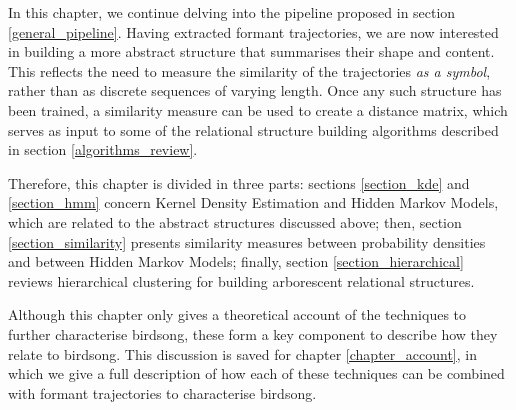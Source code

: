 \documentclass[../main.tex]{subfiles}
\begin{document}
 \label{chapter_hmms}
In this chapter, we continue delving into the pipeline proposed in section \ref{general_pipeline}. Having extracted formant trajectories, we are now interested in building a more abstract structure that summarises their shape and content. This reflects the need to measure the similarity of the trajectories \emph{as a symbol}, rather than as discrete sequences of varying length. Once any such structure has been trained, a similarity measure can be used to create a distance matrix, which serves as input to some of the relational structure building algorithms described in section \ref{algorithms_review}.
\par Therefore, this chapter is divided in three parts: sections \ref{section_kde} and \ref{section_hmm} concern Kernel Density Estimation and Hidden Markov Models, which are related to the abstract structures discussed above; then, section \ref{section_similarity} presents similarity measures between probability densities and between Hidden Markov Models; finally, section \ref{section_hierarchical} reviews hierarchical clustering for building arborescent relational structures.
\par Although this chapter only gives a theoretical account of the techniques to further characterise birdsong, these form a key component to describe how they relate to birdsong. This discussion is saved for chapter \ref{chapter_account}, in which we give a full description of how each of these techniques can be combined with formant trajectories to characterise birdsong.
\end{document}
